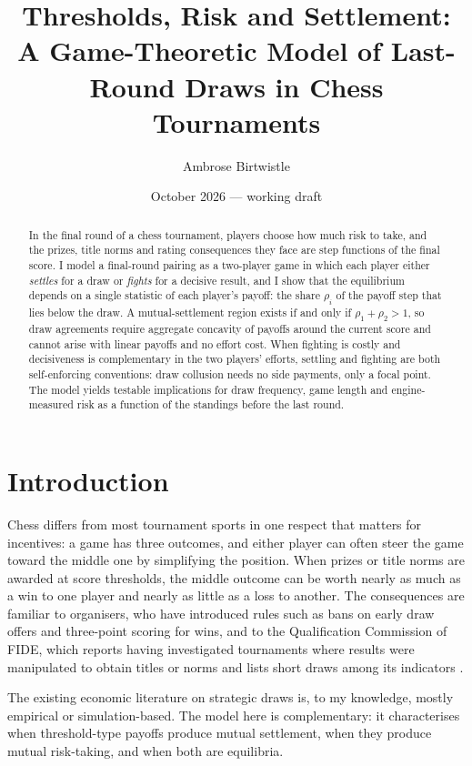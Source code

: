 \documentclass[11pt]{article}
\title{Thresholds, Risk and Settlement:\\
A Game-Theoretic Model of Last-Round Draws in Chess Tournaments}
\author{Ambrose Birtwistle}
\date{October 2026 --- working draft}
\theoremstyle{definition}
\begin{document}
\maketitle

\begin{abstract}
In the final round of a chess tournament, players choose how much risk to
take, and the prizes, title norms and rating consequences they face are
step functions of the final score. I model a final-round pairing as a
two-player game in which each player either \emph{settles} for a draw or
\emph{fights} for a decisive result, and I show that the equilibrium depends
on a single statistic of each player's payoff: the share $\rho_i$ of the
payoff step that lies below the draw. A mutual-settlement region exists
if and only if $\rho_1+\rho_2>1$, so draw agreements require
aggregate concavity of payoffs around the current score and cannot arise with
linear payoffs and no effort cost. When fighting is costly and decisiveness
is complementary in the two players' efforts, settling and fighting are both
self-enforcing conventions: draw collusion needs no side payments, only a
focal point. The model yields testable implications for draw frequency,
game length and engine-measured risk as a function of the standings
before the last round.
\end{abstract}

\section{Introduction}

Chess differs from most tournament sports in one respect that matters for
incentives: a game has three outcomes, and either player can often steer
the game toward the middle one by simplifying the position. When prizes or
title norms are awarded at score thresholds, the middle outcome can be worth
nearly as much as a win to one player and nearly as little as a loss to
another. The consequences are familiar to organisers, who have introduced
rules such as bans on early draw offers and three-point scoring for wins, and
to the Qualification Commission of FIDE, which reports having investigated
tournaments where results were manipulated to obtain titles or norms and
lists short draws among its indicators \citep{fide_qc}.

The existing economic literature on strategic draws is, to my knowledge,
mostly empirical or simulation-based. The model here is complementary: it
characterises when threshold-type payoffs produce mutual settlement, when
they produce mutual risk-taking, and when both are equilibria.
\end{document}
